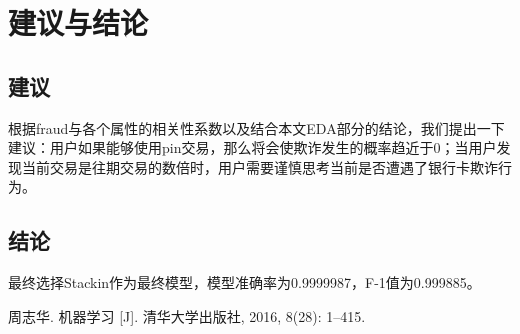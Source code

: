 \section{建议与结论}
\subsection{建议}
根据fraud与各个属性的相关性系数以及结合本文EDA部分的结论，我们提出一下建议：用户如果能够使用pin交易，那么将会使欺诈发生的概率趋近于0；当用户发现当前交易是往期交易的数倍时，用户需要谨慎思考当前是否遭遇了银行卡欺诈行为。

\subsection{结论}
最终选择Stackin作为最终模型，模型准确率为0.9999987，F-1值为0.999885。








\begin{thebibliography}{99}
	周志华. 机器学习 [J]. 清华大学出版社, 2016, 8(28): 1–415.
\end{thebibliography}	


	

